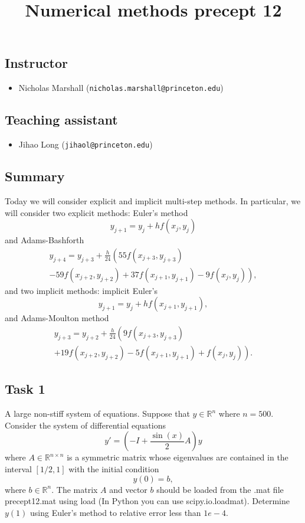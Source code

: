 \documentclass{amsart}
\title{Numerical methods precept 12}
\theoremstyle{remark}
\begin{document}
\maketitle

\subsection{Instructor} 
\begin{itemize}
\item Nicholas Marshall (\texttt{nicholas.marshall@princeton.edu})
\end{itemize}
\subsection{Teaching assistant}
\begin{itemize} 
\item Jihao Long (\texttt{jihaol@princeton.edu})
\end{itemize}


\subsection{Summary} 
Today we will consider explicit and implicit multi-step methods. In particular,
we will consider two explicit methods: Euler's method
$$
y_{j+1} = y_j + h f(x_j,y_j)
$$
and Adams-Bashforth
\begin{multline*}
y_{j+4} = y_{j+3} + \frac{h}{24} \left( 55 f(x_{j+3},y_{j+3}) 
\right. \\ \left.
-59
f(x_{j+2},y_{j+2}) + 37 f(x_{j+1},y_{j+1}) - 9 f(x_j,y_j)
\right),
\end{multline*}
and two implicit methods: implicit Euler's
$$
y_{j+1} = y_j + h f(x_{j+1},y_{j+1}),
$$
and Adams-Moulton method
\begin{multline*}
y_{j+3} = y_{j+2} + \frac{h}{24} \left(9 f(x_{j+3},y_{j+3}) 
 \right. \\ \left.
+19
f(x_{j+2},y_{j+2}) -5 f(x_{j+1},y_{j+1}) + f(x_j,y_j) \right).
\end{multline*}

\subsection*{Task 1} A large non-stiff system of equations. Suppose that $y \in
\mathbb{R}^n$ where $n = 500$. Consider the system of differential equations
$$
y' = \left(-I + \frac{\sin(x)}{2} A \right) y 
$$
where $A \in \mathbb{R}^{n \times n}$ is a symmetric matrix whose eigenvalues
are contained in the interval $[1/2,1]$ with the initial condition 
$$
y(0) = b,
$$
where $b \in \mathbb{R}^n$. The matrix $A$ and vector $b$ should be loaded from
the .mat file precept12.mat using load (In Python you can use scipy.io.loadmat).
Determine $y(1)$ using Euler's method to relative error less than $1e-4$.
\end{document}
